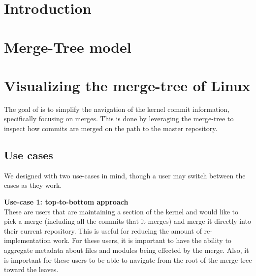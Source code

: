 \documentclass[draft]{IEEEtran}
\begin{document}
\title{\TheTitle}

\author{
        \IEEEauthorblockA{\TheAuthors}
}
\maketitle

\begin{abstract}

  

\end{abstract}


\begin{IEEEkeywords}
  \TheKeywords
\end{IEEEkeywords}

\section{Introduction}



\section{Merge-Tree model}
\label{sec:mergetree}



\section{Visualizing the merge-tree of Linux}

The goal of \tool is to simplify the navigation of the kernel commit
information, specifically focusing on merges. This is done by leveraging
the merge-tree to inspect how commits are merged on the path to the
master repository.

\subsection{Use cases}

We designed \tool with two use-cases in mind, though a user may switch
between the cases as they work.

\noindent \textbf{Use-case 1: top-to-bottom
  approach}\label{sec:usecase1}\\ These are users that are maintaining a
section of the kernel and would like to pick a merge (including all the
commits that it merges) and merge it directly into their current
repository. This is useful for reducing the amount of re-implementation
work. For these users, it is important to have the ability to aggregate
metadata about files and modules being effected by the merge. Also, it
is important for these users to be able to navigate from the root of the
merge-tree toward the leaves.
\end{document}
